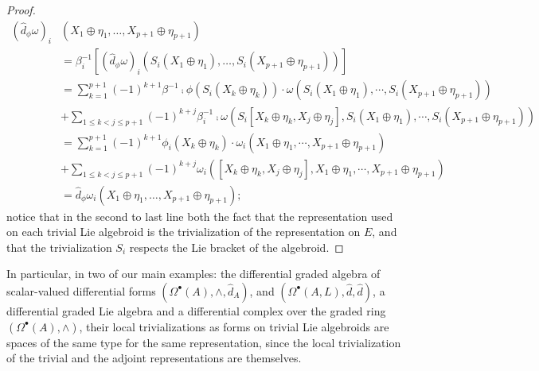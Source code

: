 \begin{proof}
\begin{align*}
    (\hat d_\phi \omega)_i&(X_1 \oplus \eta_1, \dots,  X_{p+1}\oplus \eta_{p+1}) \\ 
      &= \beta_i^{-1}[(\hat d_\phi \omega)_i(S_i(X_1 \oplus \eta_1), \dots,  S_i(X_{p+1}\oplus \eta_{p+1}))]\\
      &= \sum_{k=1}^{p+1} (-1)^{k+1} \beta^{-1} \comp \phi(S_i(X_k \oplus \eta_k))\cdot \omega( S_i(X_1\oplus \eta_1), \cdots,  S_i(X_{p+1}\oplus \eta_{p+1})) \\
      &+ \sum_{1 \leq k < j \leq p+1} (-1)^{k+j}\beta_i^{-1}\comp\omega(S_i[ X_k \oplus \eta_k, X_j \oplus \eta_j], S_i(X_1 \oplus \eta_1), \cdots, S_i(X_{p+1} \oplus \eta_{p+1}))\\
      &= \sum_{k=1}^{p+1} (-1)^{k+1} \phi_i (X_k \oplus \eta_k)\cdot \omega_i( X_1\oplus \eta_1, \cdots,  X_{p+1}\oplus \eta_{p+1}) \\
      &+ \sum_{1 \leq k < j \leq p+1} (-1)^{k+j}\omega_i([ X_k \oplus \eta_k, X_j \oplus \eta_j], X_1 \oplus \eta_1, \cdots, X_{p+1} \oplus \eta_{p+1})\\
      &= \hat d_{\phi} \omega_i(X_1 \oplus \eta_1, \dots, X_{p+1} \oplus \eta_{p+1});
\end{align*}
notice that in the second to last line both the fact that the representation used on each trivial Lie algebroid is the trivialization of the representation on $E$, and that the trivialization $S_i$ respects the Lie bracket of the algebroid.
\end{proof}

In particular, in two of our main examples: the differential graded algebra of scalar-valued differential forms $(\Omega^\bullet(A), \wedge, \hat d_A)$, and $(\Omega^\bullet(A,L), \hat d, \hat d)$, a differential graded Lie algebra and a differential complex over the graded ring $(\Omega^\bullet(A), \wedge)$, their local trivializations as forms on trivial Lie algebroids are spaces of the same type for the same representation, since the local trivialization of the trivial and the adjoint representations are themselves.

\lin

